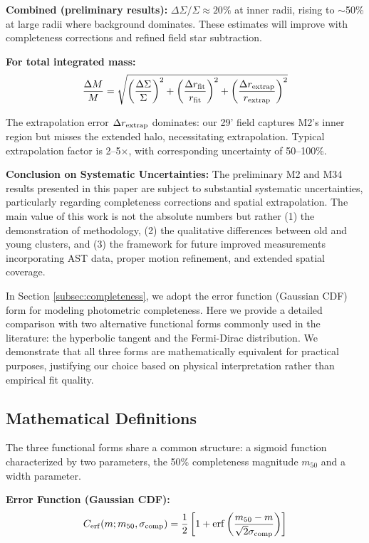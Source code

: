\documentclass[linenumbers,trackchanges,twocolumn]{aastex701}
\begin{document}
\textbf{Combined (preliminary results):} $\Delta \Sigma / \Sigma \approx 20\%$ at inner radii, rising to $\sim$50\% at large radii where background dominates. These estimates will improve with completeness corrections and refined field star subtraction.

\textbf{For total integrated mass:}
\begin{equation}
\frac{\Delta M}{M} = \sqrt{\left(\frac{\Delta \Sigma}{\Sigma}\right)^2 + \left(\frac{\Delta r_{\rm fit}}{r_{\rm fit}}\right)^2 + \left(\frac{\Delta r_{\rm extrap}}{r_{\rm extrap}}\right)^2}
\end{equation}

The extrapolation error $\Delta r_{\rm extrap}$ dominates: our 29' field captures M2's inner region but misses the extended halo, necessitating extrapolation. Typical extrapolation factor is 2--5$\times$, with corresponding uncertainty of 50--100\%.

\textbf{Conclusion on Systematic Uncertainties:} The preliminary M2 and M34 results presented in this paper are subject to substantial systematic uncertainties, particularly regarding completeness corrections and spatial extrapolation. The main value of this work is not the absolute numbers but rather (1) the demonstration of methodology, (2) the qualitative differences between old and young clusters, and (3) the framework for future improved measurements incorporating AST data, proper motion refinement, and extended spatial coverage.

In Section \ref{subsec:completeness}, we adopt the error function (Gaussian CDF) form for modeling photometric completeness. Here we provide a detailed comparison with two alternative functional forms commonly used in the literature: the hyperbolic tangent and the Fermi-Dirac distribution. We demonstrate that all three forms are mathematically equivalent for practical purposes, justifying our choice based on physical interpretation rather than empirical fit quality.

\subsection{Mathematical Definitions}

The three functional forms share a common structure: a sigmoid function characterized by two parameters, the 50\% completeness magnitude $m_{50}$ and a width parameter.

\textbf{Error Function (Gaussian CDF):}
\begin{equation}
C_{\rm erf}(m; m_{50}, \sigma_{\rm comp}) = \frac{1}{2} \left[ 1 + {\rm erf}\left( \frac{m_{50} - m}{\sqrt{2} \sigma_{\rm comp}} \right) \right]
\label{eq:app_completeness_erf}
\end{equation}
\end{document}
